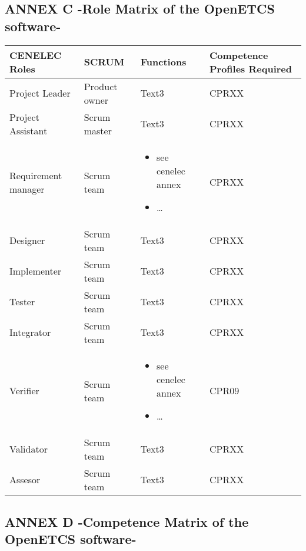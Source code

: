 \documentclass{template/openetcs_article}
\begin{document}
\subsection{ANNEX C -Role Matrix of the OpenETCS software-}
\begin{flushleft}
\tablefirsthead{}
\tablehead{}
\tabletail{}
\tablelasttail{}
\begin{supertabular}{|m{2cm}|m{2cm}|m{9cm}|m{2cm}|}
\hline
{}
CENELEC Roles &
SCRUM &
Functions &
Competence Profiles Required\\\hline
Project Leader &
Product owner &
Text3 &
CPRXX\\\hline
Project Assistant &
Scrum master &
Text3 &
CPRXX\\\hline
Requirement manager &
Scrum team &
\begin{itemize}
\item see cenelec annex
\item {\dots}
\end{itemize}
&
CPRXX\\\hline
Designer &
Scrum team &
Text3 &
CPRXX\\\hline
Implementer &
Scrum team &
Text3 &
CPRXX\\\hline
Tester &
Scrum team &
Text3 &
CPRXX\\\hline
Integrator &
Scrum team &
Text3 &
CPRXX\\\hline
Verifier &
Scrum team &
\begin{itemize}
\item see cenelec annex
\item {\dots}
\end{itemize}
&
CPR09\\\hline
Validator &
Scrum team &
Text3 &
CPRXX\\\hline
Assesor &
Scrum team &
Text3 &
CPRXX\\\hline
\end{supertabular}
\end{flushleft}

\subsection{ANNEX D -Competence Matrix of the OpenETCS software-}
\end{document}
